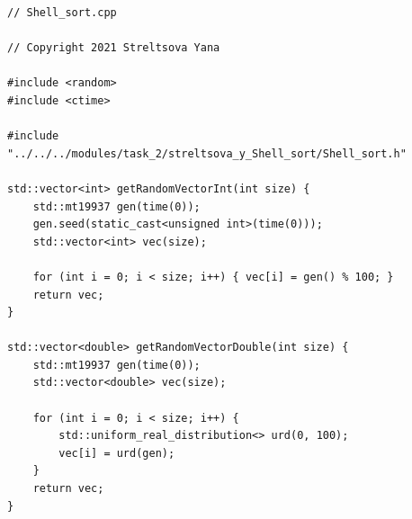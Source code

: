 \documentclass{report}
\begin{document}
\begin{lstlisting}
// Shell_sort.cpp

// Copyright 2021 Streltsova Yana

#include <random>
#include <ctime>

#include "../../../modules/task_2/streltsova_y_Shell_sort/Shell_sort.h"

std::vector<int> getRandomVectorInt(int size) {
    std::mt19937 gen(time(0));
    gen.seed(static_cast<unsigned int>(time(0)));
    std::vector<int> vec(size);

    for (int i = 0; i < size; i++) { vec[i] = gen() % 100; }
    return vec;
}

std::vector<double> getRandomVectorDouble(int size) {
    std::mt19937 gen(time(0));
    std::vector<double> vec(size);

    for (int i = 0; i < size; i++) {
        std::uniform_real_distribution<> urd(0, 100);
        vec[i] = urd(gen);
    }
    return vec;
}


\end{lstlisting}
\end{document}

